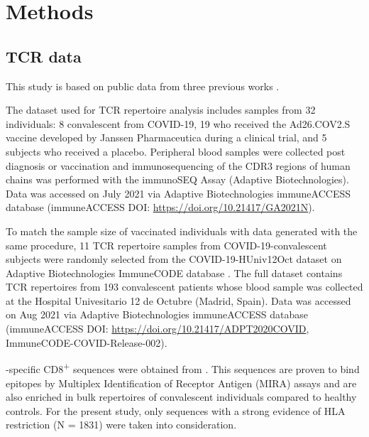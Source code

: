 \chapter{Methods}


\section*{TCR data}

This study is based on public data from three previous works \citep{janssen, immunecode, metaclonotypes}.

The dataset used for TCR repertoire analysis \citep{janssen} includes samples from 32 individuals: 8 convalescent from COVID-19, 19 who received the Ad26.COV2.S vaccine developed by Janssen Pharmaceutica during a clinical trial, and 5 subjects who received a placebo. Peripheral blood samples were collected post diagnosis or vaccination and immunosequencing of the CDR3 regions of human \TCRB{} chains was performed with the immunoSEQ Assay (Adaptive Biotechnologies). Data was accessed on July 2021 via Adaptive Biotechnologies immuneACCESS\textregistered{} database (immuneACCESS\textregistered{} DOI: \url{https://doi.org/10.21417/GA2021N}).

To match the sample size of vaccinated individuals with data generated with the same procedure, 11 TCR repertoire samples from COVID-19-convalescent subjects were randomly selected from the COVID-19-HUniv12Oct dataset on Adaptive Biotechnologies ImmuneCODE\texttrademark{} database \citep{immunecode}. The full dataset contains TCR repertoires from 193 convalescent patients whose blood sample was collected at the Hospital Univesitario 12 de Octubre (Madrid, Spain). Data was accessed on Aug 2021 via Adaptive Biotechnologies immuneACCESS\textregistered{} database (immuneACCESS\textregistered{} DOI: \url{https://doi.org/10.21417/ADPT2020COVID}, ImmuneCODE-COVID-Release-002).


\covid-specific CD8\textsuperscript{+} \TCRB{} sequences were obtained from \cite{metaclonotypes}. This sequences are proven to bind \covid{} epitopes by Multiplex Identification of Receptor Antigen (MIRA) assays \citep{immunecode} and are also enriched in bulk \TCRB{} repertoires of convalescent individuals compared to healthy controls. For the present study, only \TCRB{} sequences with a strong evidence of HLA restriction (N = 1831) were taken into consideration.

